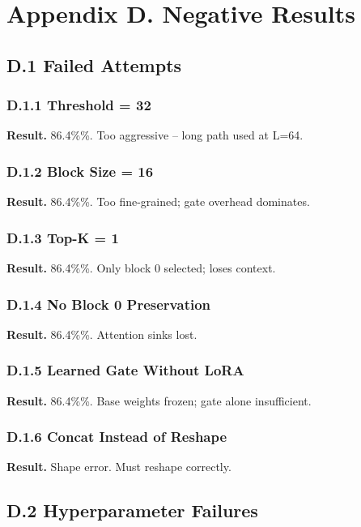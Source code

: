 \section{Appendix D. Negative Results}

\subsection{D.1 Failed Attempts}

\subsubsection{D.1.1 Threshold = 32}

\textbf{Result.} 86.4\%\%. Too aggressive -- long path used at L=64.

\subsubsection{D.1.2 Block Size = 16}

\textbf{Result.} 86.4\%\%. Too fine-grained; gate overhead dominates.

\subsubsection{D.1.3 Top-K = 1}

\textbf{Result.} 86.4\%\%. Only block 0 selected; loses context.

\subsubsection{D.1.4 No Block 0 Preservation}

\textbf{Result.} 86.4\%\%. Attention sinks lost.

\subsubsection{D.1.5 Learned Gate Without LoRA}

\textbf{Result.} 86.4\%\%. Base weights frozen; gate alone insufficient.

\subsubsection{D.1.6 Concat Instead of Reshape}

\textbf{Result.} Shape error. Must reshape correctly.

\subsection{D.2 Hyperparameter Failures}

